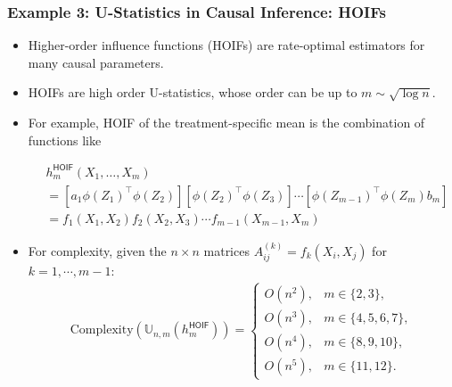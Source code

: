 \documentclass[9pt]{beamer}
\theoremstyle{mystyle}
\theoremstyle{mystyletwo}
\begin{document}
\begin{frame}
    \frametitle{Example 3: U-Statistics in Causal Inference: HOIFs}
    \begin{itemize}
        \item Higher-order influence functions (HOIFs) \citep{robins2008higher, robins2016technical} are rate-optimal estimators for many causal parameters. 
        \item HOIFs are high order U-statistics, whose order can be up to $m \sim \sqrt{\log n}$.
        \item For example, HOIF of the treatment-specific mean is the combination of functions like
              
    \begin{tcolorbox}[colframe=blue!70!black, colback=blue!5, 
                  boxrule=1.0pt, arc=1mm, 
                  enhanced, breakable]
    \begin{align*}
      &  h^{\mathsf{HOIF}}_m(X_{1}, \ldots, X_{m}) \\
      & = [a_{{1}} \phi (Z_{{1}})^{\top} \phi(Z_{2})]  [\phi (Z_{{2}})^{\top} \phi(Z_{3})] \cdots [\phi(Z_{{m-1}})^\top \phi(Z_{m})b_{m}] \\
      & = f_1(X_{1},X_{2})  f_2(X_{2},X_{3}) \cdots f_{m-1}(X_{m-1},X_{m})
    \end{align*}
    \end{tcolorbox}

    \item For complexity, given the $n \times n$ matrices $A^{(k)}_{ij} = f_k(X_i, X_j)$ for $k = 1, \cdots, m-1$:
    \begin{equation*}
    \begin{split}
    \mathrm{Complexity}(\mathbb{U}_{n,m}(h^{\mathsf{HOIF}}_m)) = \left\{ \begin{array}{ll}
    O(n^2), & m \in \{2, 3\}, \\
    O(n^3), & m \in \{4, 5, 6, 7\}, \\
    O(n^4), & m \in \{8, 9, 10\}, \\
    O(n^5), & m \in \{11, 12\}.
    \end{array} \right.
    \end{split}
    \end{equation*}
        
    
    \end{itemize}

\end{frame}
\end{document}
